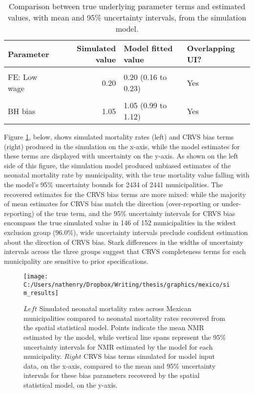 \documentclass[
]{article}
\begin{document}
\begin{table}[!h]

\caption{\label{tab:sim-param-results}Comparison between true underlying parameter terms and estimated values, with mean and 95\% uncertainty intervals, from the simulation model.}
\centering
\begin{tabular}[t]{lrll}
\toprule
Parameter & Simulated value & Model fitted value & Overlapping UI?\\
\midrule
\cellcolor{gray!6}{FE: Years of school} & \cellcolor{gray!6}{-0.25} & \cellcolor{gray!6}{-0.27 (-0.30 to -0.23)} & \cellcolor{gray!6}{Yes}\\
FE: Low wage & 0.20 & 0.20 (0.16 to 0.23) & Yes\\
\cellcolor{gray!6}{FE: No health care} & \cellcolor{gray!6}{0.50} & \cellcolor{gray!6}{0.50 (0.47 to 0.52)} & \cellcolor{gray!6}{Yes}\\
BH bias & 1.05 & 1.05 (0.99 to 1.12) & Yes\\
\bottomrule
\end{tabular}
\end{table}

Figure \ref{fig:sim-results}, below, shows simulated mortality rates (left) and CRVS bias terms (right) produced in the simulation on the x-axis, while the model estimates for these terms are displayed with uncertainty on the y-axis. As shown on the left side of this figure, the simulation model produced unbiased estimates of the neonatal mortality rate by municipality, with the true mortality value falling with the model's 95\% uncertainty bounds for 2434 of 2441 municipalities. The recovered estimates for the CRVS bias terms are more mixed: while the majority of mean estimates for CRVS bias match the direction (over-reporting or under-reporting) of the true term, and the 95\% uncertainty intervals for CRVS bias encompass the true simulated value in 146 of 152 municipalities in the widest exclusion group (96.0\%), wide uncertainty intervals preclude confident estimation about the direction of CRVS bias. Stark differences in the widths of uncertainty intervals across the three groups suggest that CRVS completeness terms for each municipality are sensitive to prior specifications.

\begin{figure}[!ht]

{\centering \texttt{[image: C:/Users/nathenry/Dropbox/Writing/thesis/graphics/mexico/sim\_results]} 

}

\caption{\(Left\) Simulated neonatal mortality rates across Mexican municipalities  compared to neonatal mortality rates recovered from the spatial statistical model. Points indicate the mean NMR estimated by the model, while vertical line spans represent the 95\% uncertainty intervals for NMR estimated by the model for each municipality. \(Right\) CRVS bias terms simulated for model input data, on the x-axis, compared to the mean and 95\% uncertainty intervals for these bias parameters recovered by the spatial statistical model, on the y-axis.}\label{fig:sim-results}
\end{figure}
\end{document}

